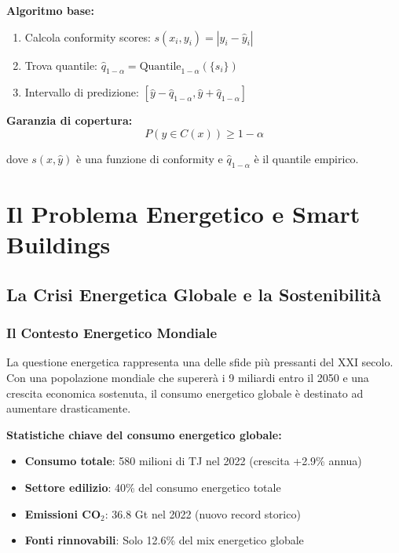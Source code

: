 \documentclass[12pt,a4paper,twoside]{report}
\begin{document}
\textbf{Algoritmo base:}
\begin{enumerate}
    \item Calcola conformity scores: $s(x_i, y_i) = |y_i - \hat{y}_i|$
    \item Trova quantile: $\hat{q}_{1-\alpha} = \text{Quantile}_{1-\alpha}(\{s_i\})$
    \item Intervallo di predizione: $[\hat{y} - \hat{q}_{1-\alpha}, \hat{y} + \hat{q}_{1-\alpha}]$
\end{enumerate}

\textbf{Garanzia di copertura:}
$$P(y \in C(x)) \geq 1 - \alpha$$

dove $s(x, \hat{y})$ è una funzione di conformity e $\hat{q}_{1-\alpha}$ è il quantile empirico.


\chapter{Il Problema Energetico e Smart Buildings}

\section{La Crisi Energetica Globale e la Sostenibilità}

\subsection{Il Contesto Energetico Mondiale}

La questione energetica rappresenta una delle sfide più pressanti del XXI secolo. Con una popolazione mondiale che supererà i 9 miliardi entro il 2050 e una crescita economica sostenuta, il consumo energetico globale è destinato ad aumentare drasticamente.

\textbf{Statistiche chiave del consumo energetico globale:}
\begin{itemize}
    \item \textbf{Consumo totale}: 580 milioni di TJ nel 2022 (crescita +2.9\% annua)
    \item \textbf{Settore edilizio}: 40\% del consumo energetico totale
    \item \textbf{Emissioni CO$_2$}: 36.8 Gt nel 2022 (nuovo record storico)
    \item \textbf{Fonti rinnovabili}: Solo 12.6\% del mix energetico globale
\end{itemize}
\end{document}

